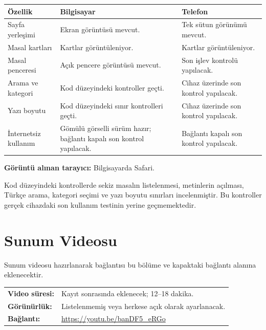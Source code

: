 \documentclass[12pt,a4paper]{article}
\newcommand{\youtubelink}{\url{https://youtu.be/banDF5_eRGo}}
\begin{document}
\begin{longtable}{@{}p{3.7cm}p{4.6cm}p{4.7cm}@{}}
\toprule
\textbf{Özellik} & \textbf{Bilgisayar}
& \textbf{Telefon}\\
\midrule
\endhead

Sayfa yerleşimi
& Ekran görüntüsü mevcut.
& Tek sütun görünümü mevcut.\\

Masal kartları
& Kartlar görüntüleniyor.
& Kartlar görüntüleniyor.\\

Masal penceresi
& Açık pencere görüntüsü mevcut.
& Son işlev kontrolü yapılacak.\\

Arama ve kategori
& Kod düzeyindeki kontroller geçti.
& Cihaz üzerinde son kontrol yapılacak.\\

Yazı boyutu
& Kod düzeyindeki sınır kontrolleri geçti.
& Cihaz üzerinde son kontrol yapılacak.\\

İnternetsiz kullanım
& Gömülü görselli sürüm hazır; bağlantı kapalı
son kontrol yapılacak.
& Bağlantı kapalı son kontrol yapılacak.\\

\bottomrule
\end{longtable}

\textbf{Görüntü alınan tarayıcı:} Bilgisayarda Safari.

Kod düzeyindeki kontrollerde sekiz masalın
listelenmesi, metinlerin açılması, Türkçe arama,
kategori seçimi ve yazı boyutu sınırları
incelenmiştir. Bu kontroller gerçek cihazdaki
son kullanım testinin yerine geçmemektedir.

\section{Sunum Videosu}

Sunum videosu hazırlanarak bağlantısı bu bölüme
ve kapaktaki bağlantı alanına eklenecektir.

\begin{center}
\begin{tabular}{@{}p{3.7cm}p{8.6cm}@{}}
\textbf{Video süresi:}
& Kayıt sonrasında eklenecek; 12--18 dakika.\\
\textbf{Görünürlük:}
& Listelenmemiş veya herkese açık olarak ayarlanacak.\\
\textbf{Bağlantı:}
& \youtubelink\\
\end{tabular}
\end{center}
\end{document}
